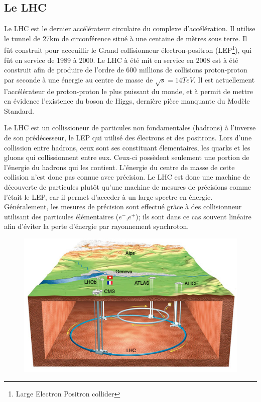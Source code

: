 \subsection{Le LHC}
Le LHC est le dernier accélérateur circulaire du complexe d'accélération. Il utilise le tunnel de 27km de circonférence situé à une centaine de mètres sous terre. Il fût construit pour acceuillir le Grand collisionneur électron-positron (LEP\footnote{Large Electron Positron collider}), qui fût en service de 1989 à 2000. Le LHC à été mit en service en 2008 est à été construit afin de produire de l'ordre de 600 millions de collisions proton-proton par seconde à une énergie au centre de masse de $\sqrt{s}=14 TeV$. Il est actuellement l'accélérateur de proton-proton le plus puissant du monde, et à permit de mettre en évidence l'existence du boson de Higgs, dernière pièce manquante du Modèle Standard.

Le LHC est un collissioneur de particules non fondamentales (hadrons) à l'inverse de son prédécesseur, le LEP qui utilisé des électrons et des positrons. Lors d'une collission entre hadrons, ceux sont ses constituant élementaires, les quarks et les gluons qui collissionnent entre eux. Ceux-ci possèdent seulement une portion de l'énergie du hadrons qui les contient. L'énergie du centre de masse de cette collision n'est donc pas connue avec précision. Le LHC est donc une machine de découverte de particules plutôt qu'une machine de mesures de précisions comme l'était le LEP, car il permet d'acceder à un large spectre en énergie. Généralement, les mesures de précision sont effectué grâce à des collisionneur utilisant des particules élémentaires ($e^{-}$,$e^{+}$); ils sont dans ce cas souvent linéaire afin d'éviter la perte d'énergie par rayonnement synchroton.

\begin{figure}
  	\centering
	\includegraphics[scale=0.6]{LHC/CERNMap.jpg}
  	\label{lhcschema}
\end{figure}

